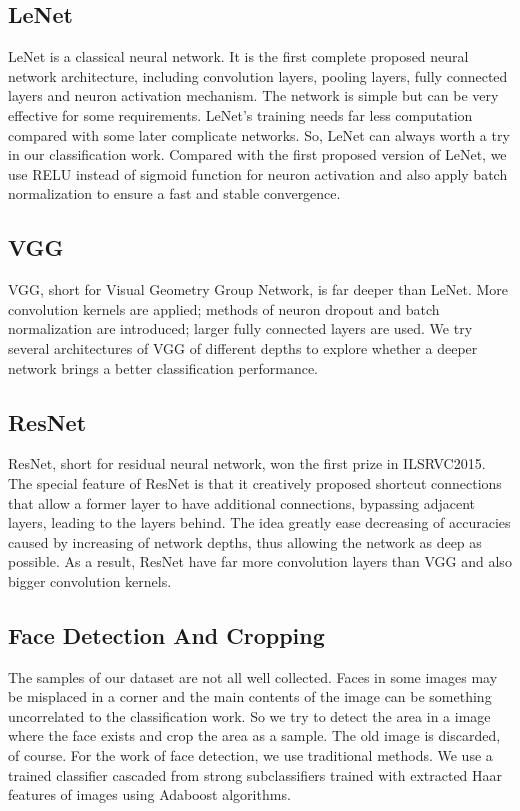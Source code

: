 \documentclass[conference]{IEEEtran}
\begin{document}
\subsection{LeNet}
LeNet is a classical neural network. It is the first complete proposed neural network architecture, including convolution layers, pooling layers, fully connected layers and neuron activation mechanism. The network is simple but can be very effective for some requirements. LeNet's training needs far less computation compared with some later complicate networks. So, LeNet can always worth a try in our classification work.
Compared with the first proposed version of LeNet, we use RELU instead of sigmoid function for neuron activation and also apply batch normalization to ensure a fast and stable convergence.

\subsection{VGG}
VGG, short for Visual Geometry Group Network, is far deeper than LeNet. More convolution kernels are applied; methods of neuron dropout and batch normalization are introduced; larger fully connected layers are used.
We try several architectures of VGG of different depths to explore whether a deeper network brings a better classification performance.

\subsection{ResNet}
ResNet, short for residual neural network, won the first prize in ILSRVC2015. The special feature of ResNet is that it creatively proposed shortcut connections that allow a former layer to have additional connections, bypassing adjacent layers, leading to the layers behind. The idea greatly ease decreasing of accuracies caused by increasing of network depths, thus allowing the network as deep as possible. As a result, ResNet have far more convolution layers than VGG and also bigger convolution kernels.

\subsection{Face Detection And Cropping}
The samples of our dataset are not all well collected. Faces in some images may be misplaced in a corner and the main contents of the image can be something uncorrelated to the classification work. So we try to detect the area in a image where the face exists and crop the area as a sample. The old image is discarded, of course.
For the work of face detection, we use traditional methods. We use a trained classifier cascaded from strong subclassifiers trained with extracted Haar features of images using Adaboost algorithms.
\end{document}
